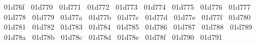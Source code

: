 {  ^^^^^^01d76f%
  ^^^^^^01d770%
  ^^^^^^01d771%
  ^^^^^^01d772%
  ^^^^^^01d773%
  ^^^^^^01d774%
  ^^^^^^01d775%
  ^^^^^^01d776%
  ^^^^^^01d777%
  ^^^^^^01d778%
  ^^^^^^01d779%
  ^^^^^^01d77a%
  ^^^^^^01d77b%
  ^^^^^^01d77c%
  ^^^^^^01d77d%
  ^^^^^^01d77e%
  ^^^^^^01d77f%
  ^^^^^^01d780%
  ^^^^^^01d781%
  ^^^^^^01d782%
  ^^^^^^01d783%
  ^^^^^^01d784%
  ^^^^^^01d785%
  ^^^^^^01d786%
  ^^^^^^01d787%
  ^^^^^^01d788%
  ^^^^^^01d789%
  ^^^^^^01d78a%
  ^^^^^^01d78b%
  ^^^^^^01d78c%
  ^^^^^^01d78d%
  ^^^^^^01d78e%
  ^^^^^^01d78f%
  ^^^^^^01d790%
  ^^^^^^01d791%
}

